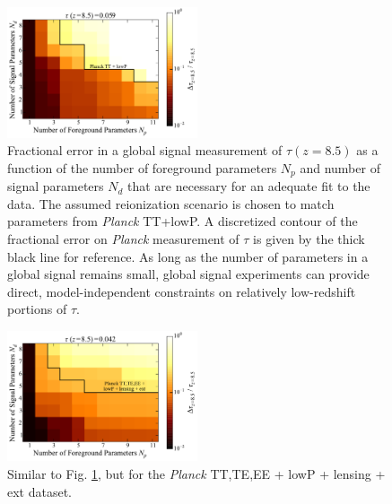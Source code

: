 \documentclass[twocolumn,aps,prd,nofootinbib,showpacs,superscriptaddress]{revtex4-1}
\begin{document}
\begin{figure}[!]
\centering
\includegraphics[width=0.5\textwidth]{figures/PlanckTTlowP_globalSigErrors.pdf}
\caption{Fractional error in a global signal measurement of $\tau(z=8.5)$ as a function of the number of foreground parameters $N_p$ and number of signal parameters $N_d$ that are necessary for an adequate fit to the data. The assumed reionization scenario is chosen to match parameters from \emph{Planck} TT+lowP. A discretized contour of the fractional error on \emph{Planck} measurement of $\tau$ is given by the thick black line for reference. As long as the number of parameters in a global signal remains small, global signal experiments can provide direct, model-independent constraints on relatively low-redshift portions of $\tau$.}
\label{fig:PlanckTTlowP_globalSigErrors}
\end{figure}

\begin{figure}[!]
\centering
\includegraphics[width=0.5\textwidth]{figures/PlanckTTTEEElowPlensingext_globalSigErrors.pdf}
\caption{Similar to Fig. \ref{fig:PlanckTTlowP_globalSigErrors}, but for the \emph{Planck} TT,TE,EE + lowP + lensing + ext  dataset.}
\label{fig:PlanckTTTEEElowPlensingext_globalSigErrors}
\end{figure}
\end{document}
